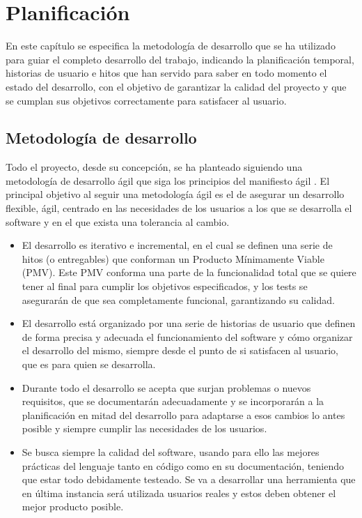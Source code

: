 \chapter{Planificación}
En este capítulo se especifica la metodología de desarrollo que se ha utilizado
para guiar el completo desarrollo del trabajo, indicando la planificación
temporal, historias de usuario e hitos que han servido para saber en todo
momento el estado del desarrollo, con el objetivo de garantizar la calidad del
proyecto y que se cumplan sus objetivos correctamente para satisfacer al
usuario.

\section{Metodología de desarrollo}
Todo el proyecto, desde su concepción, se ha planteado siguiendo una metodología
de desarrollo ágil que siga los principios del manifiesto ágil
\cite{agilemanifesto}. El principal objetivo al seguir una metodología ágil es
el de asegurar un desarrollo flexible, ágil, centrado en las necesidades de los
usuarios a los que se desarrolla el software y en el que exista una tolerancia
al cambio.

\begin{itemize}
    \item El desarrollo es iterativo e incremental, en el cual se definen una
    serie de hitos (o entregables) que conforman un Producto Mínimamente Viable
    (PMV). Este PMV conforma una parte de la funcionalidad total que se quiere
    tener al final para cumplir los objetivos especificados, y los tests se
    asegurarán de que sea completamente funcional, garantizando su calidad.
    \item El desarrollo está organizado por una serie de historias de usuario
    que definen de forma precisa y adecuada el funcionamiento del software y
    cómo organizar el desarrollo del mismo, siempre desde el punto de si
    satisfacen al usuario, que es para quien se desarrolla.
    \item Durante todo el desarrollo se acepta que surjan problemas o nuevos
    requisitos, que se documentarán adecuadamente y se incorporarán a la
    planificación en mitad del desarrollo para adaptarse a esos cambios lo antes
    posible y siempre cumplir las necesidades de los usuarios.
    \item Se busca siempre la calidad del software, usando para ello las mejores
    prácticas del lenguaje tanto en código como en su documentación, teniendo
    que estar todo debidamente testeado. Se va a desarrollar una herramienta que
    en última instancia será utilizada usuarios reales y estos deben obtener el
    mejor producto posible.
\end{itemize}

